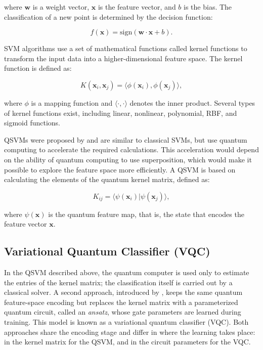 \noindent where $\mathbf{w}$ is a weight vector, $\mathbf{x}$ is the feature vector, and $b$ is the bias. The classification of a new point is determined by the decision function:

\begin{equation}
f(\mathbf{x}) = \text{sign}(\mathbf{w} \cdot \mathbf{x} + b).
\end{equation}

SVM algorithms use a set of mathematical functions called kernel functions to transform the input data into a higher-dimensional feature space. The kernel function is defined as:

\begin{equation}
K(\mathbf{x}_i, \mathbf{x}_j) = \langle \phi(\mathbf{x}_i), \phi(\mathbf{x}_j) \rangle,
\end{equation}

\noindent where $\phi$ is a mapping function and $\langle \cdot, \cdot \rangle$ denotes the inner product. Several types of kernel functions exist, including linear, nonlinear, polynomial, RBF, and sigmoid functions.

QSVMs were proposed by  and are similar to classical SVMs, but use quantum computing to accelerate the required calculations. This acceleration would depend on the ability of quantum computing to use superposition, which would make it possible to explore the feature space more efficiently. A QSVM is based on calculating the elements of the quantum kernel matrix, defined as:

\begin{equation}
K_{ij} = \langle \psi(\mathbf{x}_i) | \psi(\mathbf{x}_j) \rangle,
\end{equation}

\noindent where $\psi(\mathbf{x})$ is the quantum feature map, that is, the state that encodes the feature vector $\mathbf{x}$.

\subsection{Variational Quantum Classifier (VQC)} \label{VQC}

In the QSVM described above, the quantum computer is used only to estimate the entries of the kernel matrix; the classification itself is carried out by a classical solver. A second approach, introduced by , keeps the same quantum feature-space encoding but replaces the kernel matrix with a parameterized quantum circuit, called an \textit{ansatz}, whose gate parameters are learned during training. This model is known as a variational quantum classifier (VQC). Both approaches share the encoding stage and differ in where the learning takes place: in the kernel matrix for the QSVM, and in the circuit parameters for the VQC.

